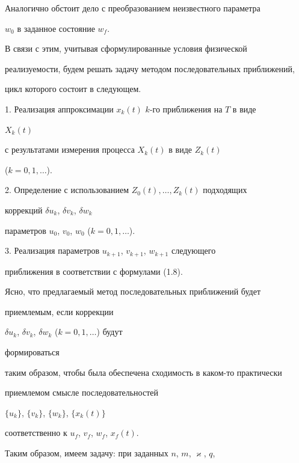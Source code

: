  


Аналогично обстоит дело с преобразованием неизвестного параметра 


$w_0$ в заданное состояние $w_f$. 


 


В связи с этим, учитывая сформулированные условия физической


реализуемости, будем решать задачу методом последовательных приближений, 


цикл которого состоит в следующем. 


 


1. Реализация аппроксимации $x_k(t)$\; $k$-го приближения на $T$ в виде 


$X_k(t)$ 


с результатами измерения процесса $X_k(t)$ в виде $Z_k(t)$ 


($k=0,1,\dotsc$). 


 


2. Определение с использованием $Z_0(t),\dotsc,Z_k(t)$ подходящих 


коррекций $\delta u_k$, $\delta v_k$, $\delta w_k$ 


параметров $u_0$, $v_0$, $w_0$ ($k=0,1,\dotsc$). 


 


3. Реализация параметров $u_{k+1}$, $v_{k+1}$, $w_{k+1}$ следующего 


приближения в соответствии с формулами (1.8). 


 


Ясно, что предлагаемый метод последовательных приближений будет 


приемлемым, если коррекции 


$\delta u_k$, $\delta v_k$, $\delta w_k$ ($k=0,1,\dotsc$) будут 


формироваться 


таким образом, чтобы была обеспечена сходимость в каком-то практически 


приемлемом смысле последовательностей 


$\{u_k\}$, $\{v_k\}$, $\{w_k\}$, $\{x_k(t)\}$  


соответственно к $u_f$, $v_f$, $w_f$, $x_f(t)$. 


 


Таким образом, имеем задачу: при заданных $n$, $m$, $\varkappa$, $q$, 


